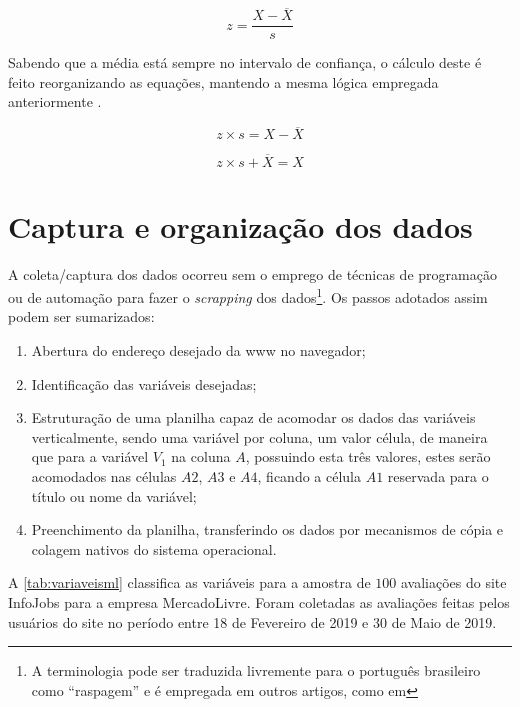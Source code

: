 	\begin{equation}
	    \label{eq:escoresz}
	    z = \dfrac{X - \overline{X}}{s}
	\end{equation}
	
	Sabendo que a média está sempre no intervalo de confiança, o cálculo deste é feito reorganizando as equações, mantendo a mesma lógica empregada anteriormente \cite[p. 47]{field2009}.
	
	\begin{equation}
	    z \times s = X - \overline{X}
	\end{equation}
	
	\begin{equation}
	    z \times s + \overline{X} = X
	\end{equation}
	
	\section{Captura e organização dos dados}
	
	A coleta/captura dos dados ocorreu sem o emprego de técnicas de programação ou de automação para fazer o \textit{scrapping} dos dados\footnote{A terminologia pode ser traduzida livremente para o português brasileiro como ``raspagem'' e é empregada em outros artigos, como em }. Os passos adotados assim podem ser sumarizados:
	
	\begin{enumerate}
	    \item Abertura do endereço desejado da \gls{www} no navegador;
	    \item Identificação das variáveis desejadas;
	    \item Estruturação de uma planilha capaz de acomodar os dados das variáveis verticalmente, sendo uma variável por coluna, um valor célula, de maneira que para a variável $V_1$ na coluna $A$, possuindo esta três valores, estes serão acomodados nas células $A2$, $A3$ e $A4$, ficando a célula $A1$ reservada para o título ou nome da variável;
	    \item Preenchimento da planilha, transferindo os dados por mecanismos de cópia e colagem nativos do sistema operacional.
	\end{enumerate}
	
	A \autoref{tab:variaveisml} classifica as variáveis para a amostra de $100$ avaliações do site InfoJobs para a empresa MercadoLivre. Foram coletadas as avaliações feitas pelos usuários do site no período entre 18 de Fevereiro de 2019 e 30 de Maio de 2019.
	
